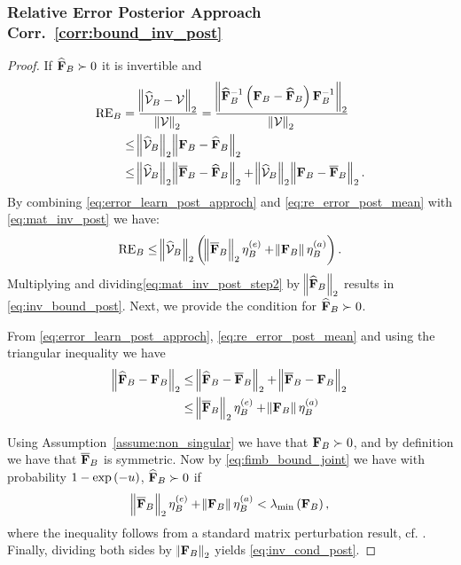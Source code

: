 \subsubsection{%
Relative Error Posterior Approach {Corr.~\ref{corr:bound_inv_post}}}\label{sec:proof_post_inv}
\begin{proof}
    If $\widehat{\mathbf{F}}_{B} \succ 0$ it is  invertible and
    \begin{align}\label{eq:mat_inv_post}
        \mathrm{RE}_{B}&=\frac{\norm{\widehat{\mathcal{V}}_{B}-\mathcal{V}}_2}{\norm{\mathcal{V}}_2}=\frac{\norm{\widehat{\mathbf{F}}_{B}^{-1}\left(\mathbf{F}_{B}-\widehat{\mathbf{F}}_{B}\right)\mathbf{F}_{B}^{-1}}_2}{\norm{\mathcal{V}}_2}\nonumber\\
        &\leq\norm{\widehat{\mathcal{V}}_{B}}_2\norm{\mathbf{F}_{B}-\widehat{\mathbf{F}}_{B}}_2\nonumber\\
        &\leq\norm{\widehat{\mathcal{V}}_{B}}_2\norm{\overline{\mathbf{F}}_{B}-\widehat{\mathbf{F}}_{B}}_2+\norm{\widehat{\mathcal{V}}_{B}}_2\norm{\mathbf{F}_{B}-\overline{\mathbf{F}}_{B}}_2 .
    \end{align}
    By combining \eqref{eq:error_learn_post_approch} and \eqref{eq:re_error_post_mean}  with \eqref{eq:mat_inv_post} we have:
    \begin{align}\label{eq:mat_inv_post_step2}
        \mathrm{RE}_{B}\leq\norm{\widehat{\mathcal{V}}_{B}}_2\left(\norm{\overline{\mathbf{F}}_{B}}_2\eta_{B}^{(e)}+\norm{\mathbf{F}_{B}}\eta_{B}^{(a)}\right).
    \end{align}    
    Multiplying and dividing\eqref{eq:mat_inv_post_step2}  by $\norm{\widehat{\mathbf{F}}_{B}}_2$  results in \eqref{eq:inv_bound_post}. Next, we provide the {%
    condition %
    for $\widehat{\mathbf{F}}_{B}\succ 0$.} {From \eqref{eq:error_learn_post_approch}, \eqref{eq:re_error_post_mean} and using the triangular  inequality we have
    \begin{align}\label{eq:fimb_bound_joint}
        \norm{\widehat{\mathbf{F}}_{B}-\mathbf{F}_{B}}_2&\leq\norm{\widehat{\mathbf{F}}_{B}-\overline{\mathbf{F}}_{B}}_2+\norm{\overline{\mathbf{F}}_{B}-\mathbf{F}_{B}}_2\nonumber\\
                              &\leq \norm{\overline{\mathbf{F}}_{B}}_2\eta_{B}^{(e)}+\norm{\mathbf{F}_{B}}\eta_{B}^{(a)} 
    \end{align}
    
    }
    
    Using Assumption~\ref{assume:non_singular}  we have that $\mathbf{F}_{B}\succ 0$, and by definition we have that $\overline{\mathbf{F}}_{B}$ {is symmetric}. %
    Now by \eqref{eq:fimb_bound_joint} we have with probability $1-\exp\left(-u\right)$, $\widehat{\mathbf{F}}_{B} \succ0$ %
    if
        \begin{equation*}
       \norm{\overline{\mathbf{F}}_{B}}_2\eta_{B}^{(e)}+\norm{\mathbf{F}_{B}}\eta_{B}^{(a)} <\lambda_{\mathrm{min}}\left(\mathbf{F}_{B}\right),
    \end{equation*}
    {where the inequality follows from a standard} matrix perturbation result, cf. \cite[Theorem 2.2]{stewart1977perturbation}.
    Finally, dividing both sides by $\norm{\mathbf{F}_{B}}_2$ %
    yields \eqref{eq:inv_cond_post}.
\end{proof}
